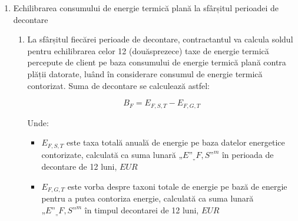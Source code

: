 \begin{enumerate}
\begin{enumerate}

\begin{center}
\begin{tabu}{|X|X|X|X|X|X|} \tabucline{}
{{with translate "ro" .Contract.Tables.calc_energy_fee}} %
	{{.Columns | column}} \\\tabucline{}
	{{range .Headers}} {{.|row}} \\\tabucline{} {{end}} %
	{{range .Rows}} {{.|row}} \\\tabucline{} {{end}} %
	\bfseries {{total .}} \\\tabucline{} %
{{end}}
\end{tabu}
\end{center}

\item Contractantul lunar va factura administratorului clientului taxa totală lunară pentru energia termică ($"E" _ "F, G" ^ "m"$). Administratorul va factura pe fiecare proprietar de apartamente pe o bază pro rata a unui metru pătrat.

  \end{enumerate}

\item Echilibrarea consumului de energie termică plană la sfârșitul perioadei de decontare

  \begin{enumerate}

  \item La sfârșitul fiecărei perioade de decontare, contractantul va calcula soldul pentru echilibrarea celor 12 (douăsprezece) taxe de energie termică percepute de client pe baza consumului de energie termică plană contra plății datorate, luând în considerare consumul de energie termică contorizat. Suma de decontare se calculează astfel:

    \[ B_F = E_{F,S,T} - E_{F,G,T} \]

Unde:
\begin{itemize}[label={}]    
\item $E_{F, S, T}$ \quad \quad este taxa totală anuală de energie pe baza datelor energetice contorizate, calculată ca suma lunară $„E” _ „F, S” ^ m$ în perioada de decontare de 12 luni, $EUR$
\item $E_{F, G, T}$ \quad \quad este vorba despre taxoni totale de energie pe bază de energie pentru a putea contoriza energie, calculată ca suma lunară $„E” _ „F, S” ^ m$ în timpul decontarei de 12 luni, $EUR$
\end{itemize}


\end{enumerate}
\end{enumerate}
